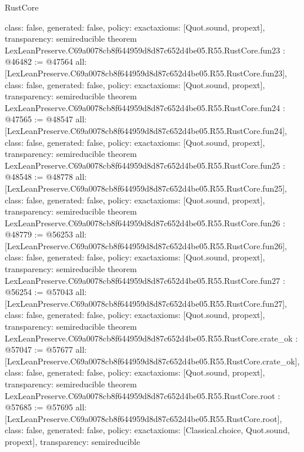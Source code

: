 \begin{lexlean}{RustCore}
\begin{coremodule}
{  class: false,
  generated: false,
  policy: exact{axioms: [Quot.sound, propext]},
  transparency: semireducible
}
theorem LexLeanPreserve.C69a0078cb8f644959d8d87c652d4be05.R55.RustCore.fun23 : @46482 := @47564 {
  all: [LexLeanPreserve.C69a0078cb8f644959d8d87c652d4be05.R55.RustCore.fun23],
  class: false,
  generated: false,
  policy: exact{axioms: [Quot.sound, propext]},
  transparency: semireducible
}
theorem LexLeanPreserve.C69a0078cb8f644959d8d87c652d4be05.R55.RustCore.fun24 : @47565 := @48547 {
  all: [LexLeanPreserve.C69a0078cb8f644959d8d87c652d4be05.R55.RustCore.fun24],
  class: false,
  generated: false,
  policy: exact{axioms: [Quot.sound, propext]},
  transparency: semireducible
}
theorem LexLeanPreserve.C69a0078cb8f644959d8d87c652d4be05.R55.RustCore.fun25 : @48548 := @48778 {
  all: [LexLeanPreserve.C69a0078cb8f644959d8d87c652d4be05.R55.RustCore.fun25],
  class: false,
  generated: false,
  policy: exact{axioms: [Quot.sound, propext]},
  transparency: semireducible
}
theorem LexLeanPreserve.C69a0078cb8f644959d8d87c652d4be05.R55.RustCore.fun26 : @48779 := @56253 {
  all: [LexLeanPreserve.C69a0078cb8f644959d8d87c652d4be05.R55.RustCore.fun26],
  class: false,
  generated: false,
  policy: exact{axioms: [Quot.sound, propext]},
  transparency: semireducible
}
theorem LexLeanPreserve.C69a0078cb8f644959d8d87c652d4be05.R55.RustCore.fun27 : @56254 := @57043 {
  all: [LexLeanPreserve.C69a0078cb8f644959d8d87c652d4be05.R55.RustCore.fun27],
  class: false,
  generated: false,
  policy: exact{axioms: [Quot.sound, propext]},
  transparency: semireducible
}
theorem LexLeanPreserve.C69a0078cb8f644959d8d87c652d4be05.R55.RustCore.crate_ok : @57047 := @57677 {
  all: [LexLeanPreserve.C69a0078cb8f644959d8d87c652d4be05.R55.RustCore.crate_ok],
  class: false,
  generated: false,
  policy: exact{axioms: [Quot.sound, propext]},
  transparency: semireducible
}
theorem LexLeanPreserve.C69a0078cb8f644959d8d87c652d4be05.R55.RustCore.root : @57685 := @57695 {
  all: [LexLeanPreserve.C69a0078cb8f644959d8d87c652d4be05.R55.RustCore.root],
  class: false,
  generated: false,
  policy: exact{axioms: [Classical.choice, Quot.sound, propext]},
  transparency: semireducible
}


\end{coremodule}
\end{lexlean}
